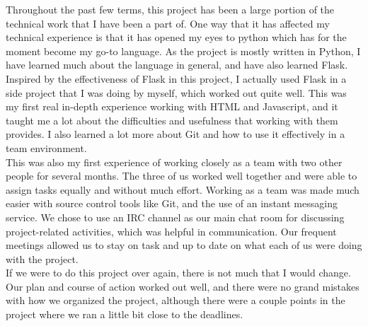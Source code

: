 Throughout the past few terms, this project has been a large portion of the technical work that I have been a part of. One way that it has affected my technical experience is that it has opened my eyes to python which has for the moment become my go-to language. As the project is mostly written in Python, I have learned much about the language in general, and have also learned Flask. Inspired by the effectiveness of Flask in this project, I actually used Flask in a side project that I was doing by myself, which worked out quite well. This was my first real in-depth experience working with HTML and Javascript, and it taught me a lot about the difficulties and usefulness that working with them provides. I also learned a lot more about Git and how to use it effectively in a team environment. \\
This was also my first experience of working closely as a team with two other people for several months. The three of us worked well together and were able to assign tasks equally and without much effort. Working as a team was made much easier with source control tools like Git, and the use of an instant messaging service. We chose to use an IRC channel as our main chat room for discussing project-related activities, which was helpful in communication. Our frequent meetings allowed us to stay on task and up to date on what each of us were doing with the project. \\
If we were to do this project over again, there is not much that I would change. Our plan and course of action worked out well, and there were no grand mistakes with how we organized the project, although there were a couple points in the project where we ran a little bit close to the deadlines.